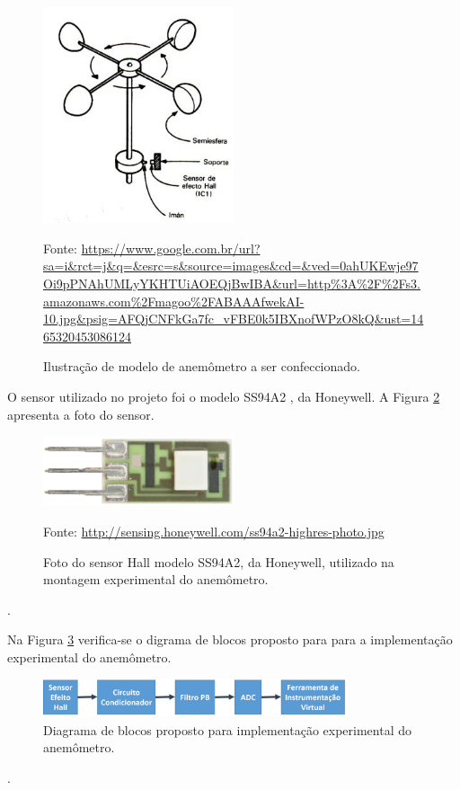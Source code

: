 \documentclass[a4paper]{instrumentacao}
\begin{document}
\begin{figure}[H]
	\centering \includegraphics[width=0.5\textwidth]{anemometro-ilustracao.jpg}
	\caption{Ilustração de modelo de anemômetro a ser confeccionado.}
	Fonte:  \url{https://www.google.com.br/url?sa=i&rct=j&q=&esrc=s&source=images&cd=&ved=0ahUKEwje97Oi9pPNAhUMLyYKHTUiAOEQjBwIBA&url=http\%3A\%2F\%2Fs3.amazonaws.com\%2Fmagoo\%2FABAAAfwekAI-10.jpg&psig=AFQjCNFkGa7fc_vFBE0k5IBXnofWPzO8kQ&ust=1465320453086124}
	\label{fig:anemometro-ilustracao}
\end{figure}

O sensor utilizado no projeto foi o modelo SS94A2 \cite{datasheet-hall}, da Honeywell. A Figura \ref{fig:anemometro-hall-foto} apresenta a foto do sensor.

\begin{figure}[H]
	\centering \includegraphics[width=0.5\textwidth]{sensor-hall-foto.jpg}
	\caption{Foto do sensor Hall modelo SS94A2, da Honeywell, utilizado na montagem experimental do anemômetro.}
	Fonte:  \url{http://sensing.honeywell.com/ss94a2-highres-photo.jpg}
	\label{fig:anemometro-hall-foto}
\end{figure}.

Na Figura \ref{fig:anemometro-bloco-experimental} verifica-se o digrama de blocos proposto para para a implementação experimental do anemômetro.

\begin{figure}[H]
	\centering \includegraphics[width=0.8\textwidth]{anemometro-fluxograma.jpg}
	\caption{Diagrama de blocos proposto para implementação experimental do anemômetro.}
	\label{fig:anemometro-bloco-experimental}
\end{figure}.
\end{document}
